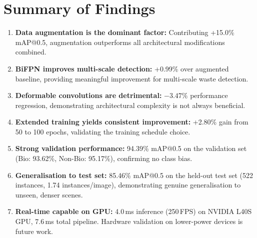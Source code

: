 \section{Summary of Findings}

\begin{enumerate}
    \item \textbf{Data augmentation is the dominant factor:} Contributing +15.0\% mAP@0.5, augmentation outperforms all architectural modifications combined.
    \item \textbf{BiFPN improves multi-scale detection:} +0.99\% over augmented baseline, providing meaningful improvement for multi-scale waste detection.
    \item \textbf{Deformable convolutions are detrimental:} $-3.47\%$ performance regression, demonstrating architectural complexity is not always beneficial.
    \item \textbf{Extended training yields consistent improvement:} +2.80\% gain from 50 to 100 epochs, validating the training schedule choice.
    \item \textbf{Strong validation performance:} 94.39\% mAP@0.5 on the validation set (Bio: 93.62\%, Non-Bio: 95.17\%), confirming no class bias.
    \item \textbf{Generalisation to test set:} 85.46\% mAP@0.5 on the held-out test set (522 instances, 1.74 instances/image), demonstrating genuine generalisation to unseen, denser scenes.
    \item \textbf{Real-time capable on GPU:} 4.0\,ms inference (250\,FPS) on NVIDIA L40S GPU, 7.6\,ms total pipeline. Hardware validation on lower-power devices is future work.
\end{enumerate}
